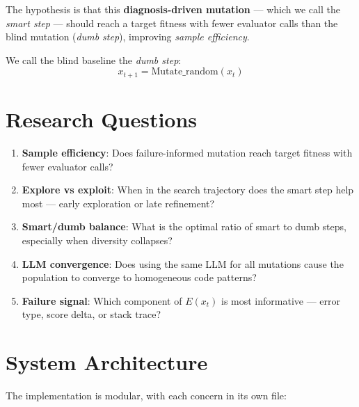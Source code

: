 \documentclass[11pt,a4paper]{article}
\begin{document}
The hypothesis is that this \textbf{diagnosis-driven mutation} --- which we
call the \emph{smart step} --- should reach a target fitness with fewer
evaluator calls than the blind mutation (\emph{dumb step}), improving
\emph{sample efficiency}.

We call the blind baseline the \textit{dumb step}:
\[
  x_{t+1} = \mathrm{Mutate\_random}(x_t)
\]

\section{Research Questions}

\begin{enumerate}
  \item[\textbf{Q1}] \textbf{Sample efficiency}: Does failure-informed mutation
    reach target fitness with fewer evaluator calls?
  \item[\textbf{Q2}] \textbf{Explore vs exploit}: When in the search trajectory
    does the smart step help most --- early exploration or late refinement?
  \item[\textbf{Q3}] \textbf{Smart/dumb balance}: What is the optimal ratio of
    smart to dumb steps, especially when diversity collapses?
  \item[\textbf{Q4}] \textbf{LLM convergence}: Does using the same LLM for all
    mutations cause the population to converge to homogeneous code patterns?
  \item[\textbf{Q5}] \textbf{Failure signal}: Which component of $E(x_t)$ is
    most informative --- error type, score delta, or stack trace?
\end{enumerate}

\section{System Architecture}

The implementation is modular, with each concern in its own file:
\end{document}
